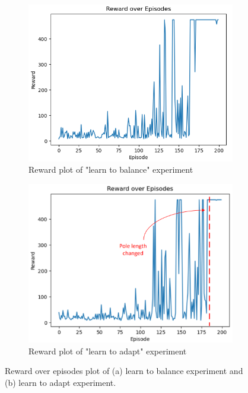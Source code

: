 \documentclass[10pt,a4paper]{article}
\begin{document}
	\begin{figure}[H]
		\centering
		\begin{subfigure}[b]{0.48\textwidth}
			\centering
			\includegraphics[width=1\linewidth]{figure/200_iterations}
			\caption{Reward plot of "learn to balance" experiment}
			\label{fig:reward_1}
		\end{subfigure}
		\hfill
		\begin{subfigure}[b]{0.48\textwidth}
			\centering
			\includegraphics[width=1\linewidth]{figure/pole_changed}
			\caption{Reward plot of "learn to adapt" experiment}
			\label{fig:reward_2}
		\end{subfigure}
		\caption{Reward over episodes plot of (a) learn to balance experiment and (b) learn to adapt experiment. }
		\label{fig:reward}
	\end{figure}
	
\end{document}

